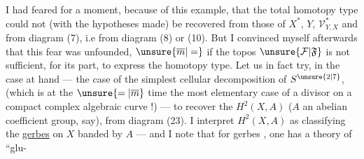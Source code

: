 I had feared for a moment, because of this example,
that the total homotopy type  could
not (with the  hypotheses made) be recovered
from those of $X^*$, $Y$, $\mathcal V^*_{Y,X}$ and from
diagram (7), i.e from diagram (8)
or (10). But I convinced myself afterwards
that this fear was unfounded, $\unsure{\overline m|=}$ if
the topos $\unsure{\mathcal F|\mathfrak F}$ is not sufficient, for its part, to
express the  homotopy type.
Let us in fact try, in the case at
hand --- the case of the simplest cellular
decomposition of $S^{\unsure{2|7}}$, (which is at the $\unsure{=|\overline m}$ time
the most  elementary case of a
divisor on a compact complex algebraic
curve !) --- to recover the $H^2(X,A)$
($A$ an abelian coefficient group, say),
from diagram (23). I interpret
$H^2(X,A)$ as classifying the \uline{gerbes} on
$X$ banded by $A$ --- and I note that for
 gerbes , one has a
theory of ``glu-
